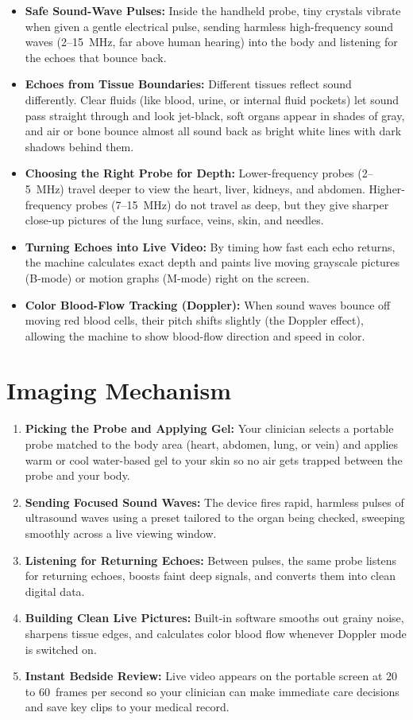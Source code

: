 \begin{itemize}
    \item \textbf{Safe Sound-Wave Pulses:} Inside the handheld probe, tiny crystals vibrate when given a gentle electrical pulse, sending harmless high-frequency sound waves (2--15~MHz, far above human hearing) into the body and listening for the echoes that bounce back.
    \item \textbf{Echoes from Tissue Boundaries:} Different tissues reflect sound differently. Clear fluids (like blood, urine, or internal fluid pockets) let sound pass straight through and look jet-black, soft organs appear in shades of gray, and air or bone bounce almost all sound back as bright white lines with dark shadows behind them.
    \item \textbf{Choosing the Right Probe for Depth:} Lower-frequency probes (2--5~MHz) travel deeper to view the heart, liver, kidneys, and abdomen. Higher-frequency probes (7--15~MHz) do not travel as deep, but they give sharper close-up pictures of the lung surface, veins, skin, and needles.
    \item \textbf{Turning Echoes into Live Video:} By timing how fast each echo returns, the machine calculates exact depth and paints live moving grayscale pictures (B-mode) or motion graphs (M-mode) right on the screen.
    \item \textbf{Color Blood-Flow Tracking (Doppler):} When sound waves bounce off moving red blood cells, their pitch shifts slightly (the Doppler effect), allowing the machine to show blood-flow direction and speed in color.
\end{itemize}

\section{Imaging Mechanism}

\begin{enumerate}
    \item \textbf{Picking the Probe and Applying Gel:} Your clinician selects a portable probe matched to the body area (heart, abdomen, lung, or vein) and applies warm or cool water-based gel to your skin so no air gets trapped between the probe and your body.
    \item \textbf{Sending Focused Sound Waves:} The device fires rapid, harmless pulses of ultrasound waves using a preset tailored to the organ being checked, sweeping smoothly across a live viewing window.
    \item \textbf{Listening for Returning Echoes:} Between pulses, the same probe listens for returning echoes, boosts faint deep signals, and converts them into clean digital data.
    \item \textbf{Building Clean Live Pictures:} Built-in software smooths out grainy noise, sharpens tissue edges, and calculates color blood flow whenever Doppler mode is switched on.
    \item \textbf{Instant Bedside Review:} Live video appears on the portable screen at 20 to 60~frames per second so your clinician can make immediate care decisions and save key clips to your medical record.
\end{enumerate}

